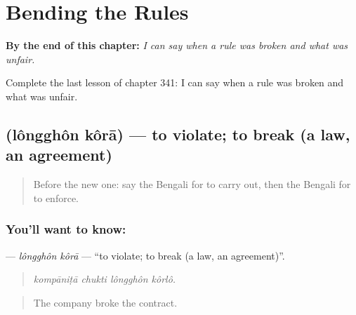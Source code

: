 
\chapter{Bending the Rules}
\label{ch:bn-bending-the-rules}

\begin{chapteropening}
\textbf{By the end of this chapter:} \emph{I can say when a rule was broken and what was unfair.}

Complete the last lesson of chapter 341: I can say when a rule was broken and what was unfair.
\end{chapteropening}

\section[\texorpdfstring{\bn{লঙ্ঘন} \bn{করা} (lôngghôn kôrā)}{লঙ্ঘন করা (lôngghôn kôrā)}]{  (lôngghôn kôrā) — to violate; to break (a law, an agreement)}

\label{lesson:BN-C341-longghon-kora}



\begin{quote}
Before the new one: say the Bengali for to carry out, then the Bengali for to enforce.
\end{quote}

\subsection*{You'll want to know:  }
\textbf{ } — \emph{lôngghôn kôrā} — \textquotedblleft{}to violate; to break (a law, an agreement)\textquotedblright{}.

\begin{quote}
   
\end{quote}

\begin{quote}
\emph{kompāniṭā chukti lôngghôn kôrlô.}
\end{quote}

\begin{quote}
The company broke the contract.
\end{quote}

